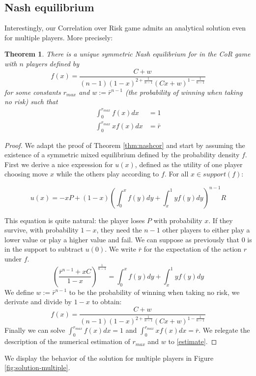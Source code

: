 \documentclass[preprint,12pt,authoryear,doubleblind]{elsarticle}
\newtheorem{theorem}{Theorem}[section]
\theoremstyle{definition}
\begin{document}
\subsection{Nash equilibrium}
Interestingly, our Correlation over Risk game admits an analytical solution even for multiple players. More precisely:
\begin{theorem}\label{thm:multiple}
    There is a unique symmetric Nash equilibrium for in the CoR game with $n$ players defined by $$f(x) = \frac{C + w}{(n-1)(1-x)^{2+\frac{1}{n-1}} (C x + w)^{1 - \frac{1}{n-1}}}$$
    for some constants $r_{max}$ and $w := \bar r ^ {n-1}$ (the probability of winning when taking no risk) such that 
    \begin{align*}
        \int_0^{r_{max}} f(x) dx &= 1 \\
        \int_0^{r_{max}} x f(x) dx &= \bar r 
    \end{align*}
\end{theorem} 
\begin{proof}
    
We adapt the proof of Theorem \ref{thm:nashcor} and start by assuming the existence of a symmetric mixed equilibrium defined by the probability density $f$. First we derive a nice expression for $u(x)$, defined as the utility of one player choosing move $x$ while the others play according to $f$. For all $x \in support(f)$:

$$u(x) = -x P + (1-x) \left( \int_0^x f(y) dy +\int_x^1 y f(y) dy \right)^{n-1} R$$

This equation is quite natural: the player loses $P$ with probability $x$. If they survive, with probability $1-x$, they need the $n-1$ other players to either play a lower value or play a higher value and fail. We can suppose as previously that $0$ is in the support to subtract $u(0)$. We write $\bar r$ for the expectation of the action $r$ under $f$.
$$\left(\frac{\bar r^{n-1} + x C}{1-x} \right)^\frac{1}{n-1} = \int_0^x f(y) dy + \int_x^1 y f(y) dy$$
We define $w := \bar r ^ {n-1}$ to be the probability of winning when taking no risk, we derivate and divide by $1-x$ to obtain:
$$f(x) = \frac{C + w}{(n-1)(1-x)^{2+\frac{1}{n-1}} (C x + w)^{1 - \frac{1}{n-1}}}$$
Finally we can solve $\int_0^{r_{max}} f(x) dx= 1$ and $\int_0^{r_{max}} x f(x) dx = \bar r$. We relegate the description of the numerical estimation of ${r_{max}}$ and $w$ to \ref{estimate}.
\end{proof}

We display the behavior of the solution for multiple players in Figure \ref{fig:solution-multiple}.
\end{document}
